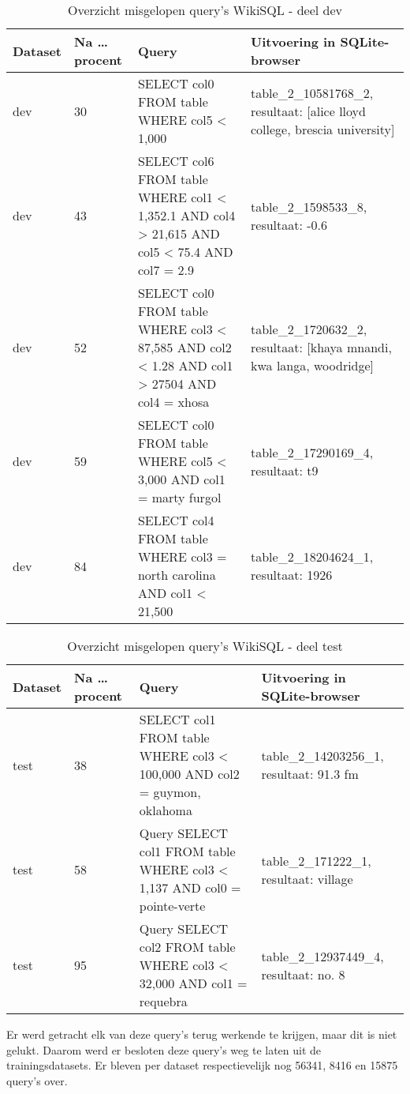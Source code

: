 \begin{table}[]
	\centering
	\begin{tabular}{ | l | l | p{5cm} | p{5cm} |}
		\hline
		Dataset & Na \dots procent & Query & Uitvoering in SQLite-browser \\ \hline
		dev 	& 30 			   & SELECT col0 FROM table WHERE col5 < 1,000 & table\_2\_10581768\_2, resultaat: [alice lloyd college, brescia university]  \\ \hline
		dev 	& 43 			   & SELECT col6 FROM table WHERE col1 < 1,352.1 AND col4 > 21,615 AND col5 < 75.4 AND col7 = 2.9  & table\_2\_1598533\_8, resultaat: -0.6  \\ \hline
		dev 	& 52 			   & SELECT col0 FROM table WHERE col3 < 87,585 AND col2 < 1.28 AND col1 > 27504 AND col4 = xhosa & table\_2\_1720632\_2, resultaat: [khaya mnandi, kwa langa, woodridge]  \\ \hline
		dev 	& 59 			   & SELECT col0 FROM table WHERE col5 < 3,000 AND col1 = marty furgol & table\_2\_17290169\_4, resultaat: t9  \\ \hline
		dev 	& 84 			   & SELECT col4 FROM table WHERE col3 = north carolina AND col1 < 21,500 & table\_2\_18204624\_1, resultaat: 1926  \\ \hline
	\end{tabular}
	\caption{Overzicht misgelopen query's WikiSQL - deel dev}
	\label{table:wikisqlerrorsdev}
\end{table}

\begin{table}[]
	\centering
	\begin{tabular}{ | l | l | p{5cm} | p{5cm} |}
		\hline
		Dataset & Na \dots procent & Query & Uitvoering in SQLite-browser \\ \hline
		test 	& 38 			   & SELECT col1 FROM table WHERE col3 < 100,000 AND col2 = guymon, oklahoma & table\_2\_14203256\_1, resultaat: 91.3 fm  \\ \hline
		test 	& 58 			   & Query SELECT col1 FROM table WHERE col3 < 1,137 AND col0 = pointe-verte & table\_2\_171222\_1, resultaat: village  \\ \hline
		test 	& 95 			   & Query SELECT col2 FROM table WHERE col3 < 32,000 AND col1 = requebra & table\_2\_12937449\_4, resultaat: no. 8  \\ \hline
	\end{tabular}
	\caption{Overzicht misgelopen query's WikiSQL - deel test}
	\label{table:wikisqlerrorstest}
\end{table}

Er werd getracht elk van deze query's terug werkende te krijgen, maar dit is niet gelukt. Daarom werd er besloten deze query's weg te laten uit de trainingsdatasets. Er bleven per dataset respectievelijk nog 56341, 8416 en 15875 query's over. 

